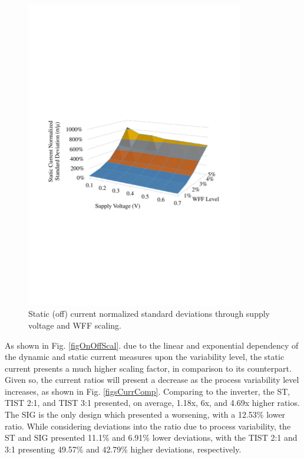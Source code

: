 \documentclass[pgmicro,diss,english]{iiufrgs}
\begin{document}
    \begin{figure}[H]
        \centering
            \includegraphics[width=0.85\textwidth, trim={1.25cm 9cm 2cm 11cm}, clip]{staticCurrDev.pdf}
            \caption{Static (off) current normalized standard deviations through supply voltage and WFF scaling.}
        \label{fig:StatCurrDev}
    \end{figure}

As shown in Fig. \ref{figOnOffScal}. due to the linear and exponential dependency of the dynamic and static current measures upon the variability level, the static current presents a much higher scaling factor, in comparison to its counterpart. Given so, the current ratios will present a decrease as the process variability level increases, as shown in Fig. \ref{figsCurrComp}. Comparing to the inverter, the ST, TIST 2:1, and TIST 3:1 presented, on average, 1.18x, 6x, and 4.69x higher ratios. The SIG is the only design which presented a worsening, with a 12.53\% lower ratio. While considering deviations into the ratio due to process variability, the ST and SIG presented 11.1\% and 6.91\% lower deviations, with the TIST 2:1 and 3:1 presenting 49.57\% and 42.79\% higher deviations, respectively.
\end{document}
